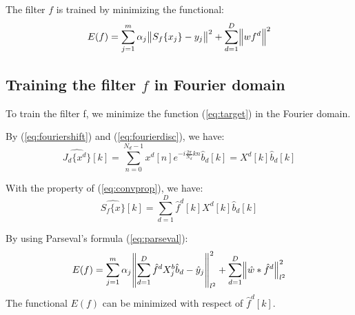\documentclass[12pt]{article}
\numberwithin{equation}{section}
\begin{document}
The filter $f$ is trained by minimizing the functional: 
\begin{equation} \label{eq:target}
	E(f)=\sum^{m}_{j=1} \alpha_j \norm{S_f\{x_j\}-y_j}^2 + \sum^D_{d=1} \norm{w f^d}^2
\end{equation}

\subsection{Training the filter $f$ in Fourier domain}
To train the filter f, we minimize the function (\ref{eq:target}) in the Fourier domain. \par
By (\ref{eq:fouriershift}) and (\ref{eq:fourierdisc}), we have:
\begin{equation}
	\widehat{J_d\{x^d\}}[k]=\sum^{N_d-1}_{n=0} x^d[n] e^{-i\frac{2\pi}{N_d}kn} \hat{b}_d[k]=X^d[k] \hat{b}_d[k] 
\end{equation} \par
With the property of (\ref{eq:convprop}), we have:
\begin{equation} \label{eq:scoreFourier}
	\widehat{S_f\{x\}}[k]= \sum^D_{d=1} \hat{f}^d[k] X^d[k] \hat{b}_d[k] 
\end{equation} \par
By using Parseval's formula (\ref{eq:parseval}):
\begin{equation} \label{eq:targetFourier}
	E(f)=\sum^{m}_{j=1} \alpha_j \norm{\sum^D_{d=1}\hat{f}^dX^b_j\hat{b}_d-\hat{y}_j}^2_{l^2}
		 + \sum^D_{d=1} \norm{\hat{w} * \hat{f}^d}^2_{l^2}
\end{equation}
The functional $E(f)$ can be minimized with respect of $\hat{f}^d[k]$. \par 

\end{document}
